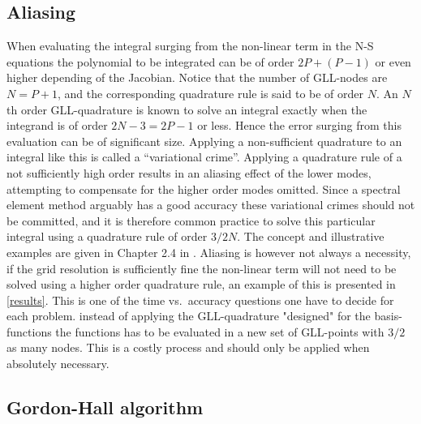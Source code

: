 

\subsection{Aliasing}

When evaluating the integral surging from the non-linear term in the N-S equations 
the polynomial to be integrated can be of order $2P+(P-1)$ or even higher depending
of the Jacobian. Notice that the number of GLL-nodes are $N=P+1$, and the corresponding
quadrature rule is said to be of order $N$. An $N$th order GLL-quadrature is known to 
solve an integral exactly when the integrand is of order $2N-3=2P-1$ or less.
Hence the error surging from this evaluation can be of significant size.
Applying a non-sufficient quadrature to an integral like this is called a ``variational
crime''. Applying a quadrature rule of a not sufficiently high order results in an 
aliasing effect of the lower modes, attempting to compensate for the higher order modes omitted. 
Since a spectral element method arguably has a good accuracy these variational crimes should 
not be committed, and it is therefore common practice to solve this particular integral using a
quadrature rule of order $3/2N$. The concept and illustrative examples are given in Chapter 2.4 in 
\cite{Karniadakis}. Aliasing is however not always a necessity, if the grid resolution is 
sufficiently fine the non-linear term will not need to be solved using a higher order quadrature rule, 
an example of this is presented in \cref{results}.
This is one of the time vs.\ accuracy questions one have to decide for each problem. 
instead of applying the GLL-quadrature "designed" for the basis-functions the functions
has to be evaluated in a new set of GLL-points with $3/2$ as many nodes. This is a costly 
process and should only be applied when absolutely necessary. 


\subsection{Gordon-Hall algorithm} \label{GH}

